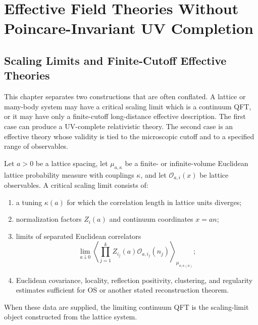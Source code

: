 \chapter{Effective Field Theories Without Poincare-Invariant UV Completion}
\label{ch:efts-without-poincare-uv-completion}
\ConventionsEuclidean

\section{Scaling Limits and Finite-Cutoff Effective Theories}

This chapter separates two constructions that are often conflated.  A
lattice or many-body system may have a critical scaling limit which is a
continuum QFT, or it may have only a finite-cutoff long-distance effective
description.  The first case can produce a UV-complete relativistic theory.
The second case is an effective theory whose validity is tied to the
microscopic cutoff and to a specified range of observables.

\begin{definition}
\label{def:critical-scaling-limit}
Let \(a>0\) be a lattice spacing, let
\(\mu_{a,\kappa}\) be a finite- or infinite-volume Euclidean lattice
probability measure with couplings \(\kappa\), and let
\(\mathcal O_{a,i}(x)\) be lattice observables.  A critical scaling limit
consists of:
\begin{enumerate}
\item a tuning \(\kappa(a)\) for which the correlation length in lattice
      units diverges;
\item normalization factors \(Z_i(a)\) and continuum coordinates
      \(x=a n\);
\item limits of separated Euclidean correlators
      \[
        \lim_{a\downarrow0}
        \left\langle
          \prod_{j=1}^k Z_{i_j}(a)\mathcal O_{a,i_j}(n_j)
        \right\rangle_{\mu_{a,\kappa(a)}} ;
      \]
\item Euclidean covariance, locality, reflection positivity, clustering, and
      regularity estimates sufficient for OS or another stated
      reconstruction theorem.
\end{enumerate}
When these data are supplied, the limiting continuum QFT is the scaling-limit
object constructed from the lattice system.
\end{definition}

